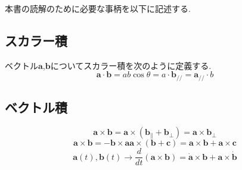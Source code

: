 \documentclass[dvipdfmx,uplatex]{jsarticle}
\begin{document}
本書の読解のために必要な事柄を以下に記述する.

\subsection{スカラー積}
ベクトル$\bm{a}$,$\bm{b}$についてスカラー積を次のように定義する.
\[
	\bm{a} \cdot \bm{b} = ab \cos \theta = a \cdot \bm{b_{//}} = \bm{a_{//}} \cdot b
\]

\subsection{ベクトル積}
\[
\bm{a} \times \bm{b} = \bm{a} \times \left( \bm{b_{\parallel}} + \bm{b_{\perp}} \right) = \bm{a} \times \bm{b_{\perp}}
\]
\[
\bm{a} \times \bm{b} = - \bm{b} \times \bm{a}
\bm{a} \times \left( \bm{b} +\bm{c} \right )= \bm{a} \times \bm{b} +\bm{a} \times \bm{c}
\]
\[
\bm{a}(t), \bm{b}(t) \to \frac{d}{dt} ( \bm{a} \times \bm{b} )  =  \bm{\dot{a}} \times \bm{b} + \bm{a} \times \bm{\dot{b}}
\]
\end{document}
